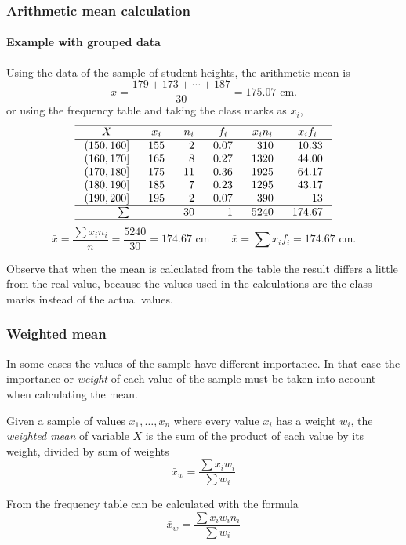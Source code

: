 \begin{frame}
\frametitle{Arithmetic mean calculation}
\framesubtitle{Example with grouped data}
Using the data of the sample of student heights, the arithmetic mean is 
\[
\bar{x} = \frac{179+173+\cdots+187}{30} = 175.07 \mbox{ cm}.
\]
or using the frequency table and taking the class marks as $x_i$,
\[
\setlength\arraycolsep{3mm}
\setlength\arrayrulewidth{0.5pt}
\begin{array}{rrrrrr}
\hline
\multicolumn{1}{c}{X} & \multicolumn{1}{c}{x_i} & \multicolumn{1}{c}{n_i} & \multicolumn{1}{c}{f_i} & \multicolumn{1}{c}{x_in_i} & \multicolumn{1}{c}{x_if_i}\\
\hline
(150,160] & 155 & 2 & 0.07 & 310 & 10.33\\
(160,170] & 165 & 8 & 0.27 & 1320 & 44.00\\
(170,180] & 175 & 11 & 0.36 & 1925 & 64.17\\
(180,190] & 185 & 7 & 0.23 & 1295 & 43.17\\
(190,200] & 195 & 2 & 0.07 & 390 & 13 \\
\hline
\sum &  & 30 & 1 & 5240 & 174.67 \\
\hline
\end{array}
\]
\[
\bar{x} = \frac{\sum x_in_i}{n} = \frac{5240}{30}= 174.67 \mbox{ cm}\qquad \bar{x}=\sum{x_if_i} = 174.67 \mbox{ cm}.
\]

Observe that when the mean is calculated from the table the result differs a little from the real value, because the
values used in the calculations are the class marks instead of the actual values.
\end{frame}


\begin{frame}
\frametitle{Weighted mean}
In some cases the values of the sample have different importance. 
In that case the importance or \emph{weight} of each value of the sample must be taken into account when calculating
the mean. 

\begin{definition}
Given a sample of values $x_1,\ldots,x_n$ where every value $x_i$ has a weight $w_i$, the \emph{weighted
mean} of variable $X$ is the sum of the product of each value by its weight, divided by sum of weights
\[
\bar{x}_w = \frac{\sum x_iw_i}{\sum w_i}
\]
\end{definition}

From the frequency table can be calculated with the formula
\[
\bar{x}_w = \frac{\sum x_iw_in_i}{\sum w_i}
\]
\end{frame}


